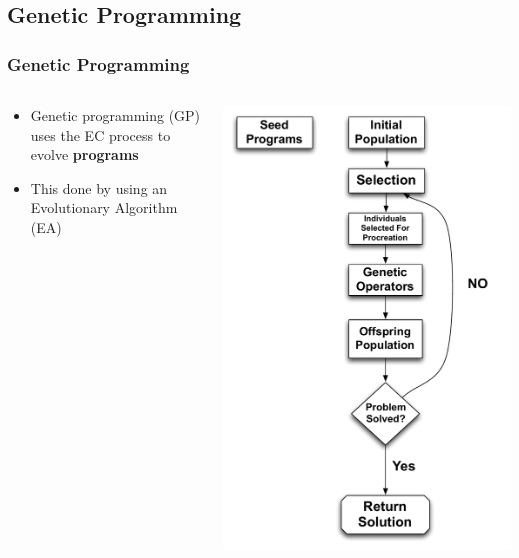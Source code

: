 \documentclass{beamer}
\begin{document}
\subsection[Genetic Programming]{Genetic Programming}
\begin{frame}
	\frametitle{Genetic Programming}
\begin{columns}[T]
\begin{column}{0.5\textwidth}
\begin{itemize}	
	\item Genetic programming (GP) uses the EC process to evolve \textbf{programs}
	\item This done by using an Evolutionary Algorithm (EA)
	
	
\end{itemize}
\end{column}
\begin{column}{0.5\textwidth}
   \includegraphics[height=0.85\textheight]{Illustrations/GP1.pdf}
       \\
\end{column}
\end{columns}

\end{frame}
\end{document}
